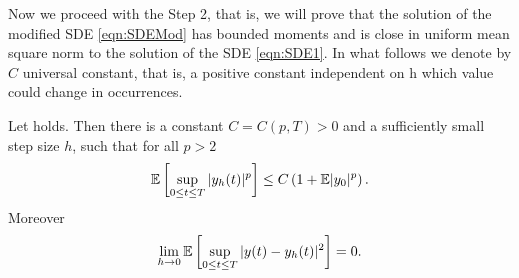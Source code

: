 	Now we proceed with the Step 2, that is,  we will prove that the solution  of the modified
SDE \eqref{eqn:SDEMod} has bounded moments and is close in uniform mean square norm to the solution of the SDE 
\eqref{eqn:SDE1}. In what follows we denote by $C$ universal constant, that is, a positive constant
independent on h which value could change in occurrences.


\begin{lem}\label{lem:BoundAndConvergenceOfyh}
	Let  holds. Then there is a constant $C=C(p,T)>0$ and a sufficiently small
	step size $h$, such that for all $p>2$
	\begin{equation}\label{eqn:yh-MomentBounds}
		\mathbb{E}\left[
			\sup_{0\leq t \leq T}
				|y_h(t)|^p
		\right]
		\leq
			C
		\left( 
			1+\mathbb{E}|y_0|^p
		\right).
	\end{equation}
	Moreover
	\begin{equation}\label{eqn:yh-convergence}
	\lim_{h \to 0}
	\mathbb{E}\left[
	\sup_{0\leq t \leq T}
	|y(t)-y_h(t)|^2
	\right]=0.
	\end{equation}
\end{lem}
